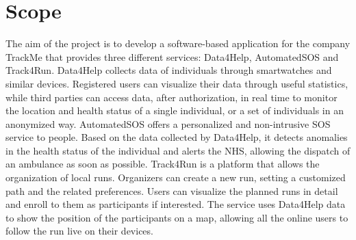 \section{Scope}
The aim of the project is to develop a software-based application for the company TrackMe that
provides three different services: Data4Help, AutomatedSOS and Track4Run.
Data4Help collects data of individuals through smartwatches and similar devices. Registered users can
visualize their data through useful statistics, while third parties can access data, after authorization,
in real time to monitor the location and health status of a single individual, or a set of individuals in an
anonymized way.
AutomatedSOS offers a personalized and non-intrusive SOS service to  people. Based on the
data collected by Data4Help, it detects anomalies in the health status of the individual and alerts the NHS, allowing the dispatch of an ambulance as soon as possible.
Track4Run is a platform that allows the organization of local runs. Organizers can create a new run, setting a customized path and the related preferences. Users can visualize the planned runs in detail and enroll to them as participants if interested. The
service uses Data4Help data to show the position of the participants on a map, allowing all the online users to follow the run live on their devices.